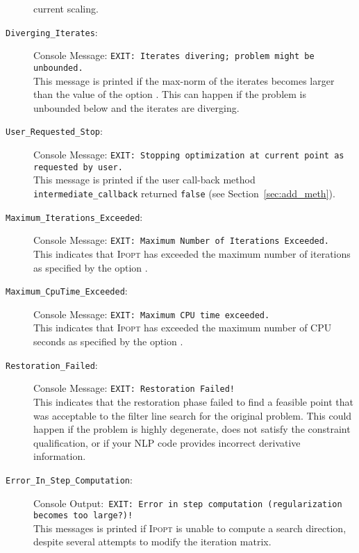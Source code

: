 \documentclass[10pt]{article}
\newcommand{\Ipopt}{\textsc{Ipopt}\xspace}
\begin{document}
\begin{description}
  current scaling.
\item[{\tt Diverging\_Iterates}:]  $\;$ \\
  Console Message: {\tt EXIT: Iterates divering; problem might be
    unbounded.} \\
  This message is printed if the max-norm of the iterates becomes
  larger than the value of the option
  .
  This can happen if the problem is unbounded below and the iterates
  are diverging.
\item[{\tt User\_Requested\_Stop}:]  $\;$ \\
  Console Message: {\tt EXIT: Stopping optimization at current point
    as requested by user.} \\
  This message is printed if the user call-back method {\tt
    intermediate\_callback} returned {\tt false} (see
  Section~\ref{sec:add_meth}).
\item[{\tt Maximum\_Iterations\_Exceeded}:]  $\;$ \\
  Console Message: {\tt EXIT: Maximum Number of Iterations Exceeded.} \\
  This indicates that \Ipopt has exceeded the maximum number of
  iterations as specified by the option .
\item[{\tt Maximum\_CpuTime\_Exceeded}:]  $\;$ \\
  Console Message: {\tt EXIT: Maximum CPU time exceeded.} \\
  This indicates that \Ipopt has exceeded the maximum number of
  CPU seconds as specified by the option .
\item[{\tt Restoration\_Failed}:]  $\;$ \\
  Console Message: {\tt EXIT: Restoration Failed!} \\
  This indicates that the restoration phase failed to find a feasible
  point that was acceptable to the filter line search for the original
  problem. This could happen if the problem is highly degenerate, does
  not satisfy the constraint qualification, or if your NLP code
  provides incorrect derivative information.
\item[{\tt Error\_In\_Step\_Computation}:]  $\;$ \\
  Console Output:\ {\tt EXIT:\ Error in step computation (regularization becomes too large?)!} \\
  This messages is printed if \Ipopt is unable to compute a search
  direction, despite several attempts to modify the iteration matrix.

\end{description}
\end{document}
